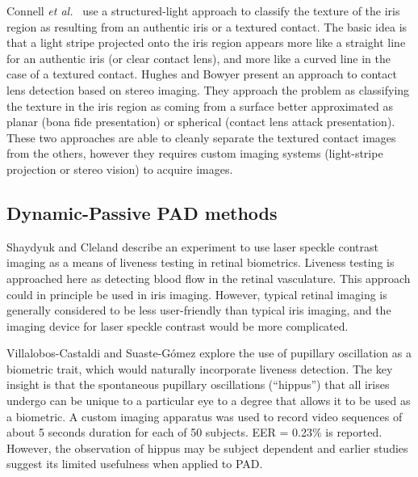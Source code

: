 \documentclass[format=acmsmall, review=false, timestamp=false]{acmart}
\newcommand{\etal}{{\it et al.}~}
\begin{document}
Connell \etal \cite{Connell_ASSP_2013} use a structured-light approach to classify the texture of the iris region as resulting from a{n authentic} iris or a textured contact. The basic idea is that a light stripe projected onto the iris region appears more like a straight {line} for a{n authentic} iris (or clear contact lens), and more like a curved line in the case of a textured contact. Hughes and Bowyer \cite{Hughes_HICSS_2013} present an approach to contact lens detection based on stereo imaging. They approach the problem as classifying the texture in the iris region as coming from a surface better approximated as planar (bona fide {presentation}) or spherical (contact lens attack {presentation}). These two approaches are able to cleanly separate the textured contact images from the others, however they requires custom imaging systems (light-stripe projection or stereo vision) to acquire images. 




\subsection{Dynamic-Passive PAD methods}
\label{sec:PADmethods_DynamicPassive}

Shaydyuk and Cleland \cite{Shaydyuk_ICCST_2016} describe an experiment to use laser speckle contrast imaging as a means of liveness testing in retinal biometrics. Liveness testing is approached here as detecting blood flow in the retinal vasculature. This approach could in principle be used in iris imaging. However, typical retinal imaging is generally considered to be less user-friendly than typical iris imag{ing}, and the imaging device for laser speckle contrast would be more complicated.

Villalobos-Castaldi and {Suaste-G\'{o}mez} \cite{Villalbos-Castaldi_BF_2014} explore the use of pupillary oscillation as a biometric trait, which would naturally incorporate liveness detection. The key insight is that the spontaneous pupillary oscillations (``hippus'') that all irises undergo can be unique to a particular eye to a degree that allows it to be used as a biometric. A custom imaging apparatus was used to record video sequences of about 5 seconds duration for each of 50 subjects. {EER = 0.23\%} is reported. However, the observation of hippus may be subject dependent and earlier studies \cite{Pacut_ICCST_2006} suggest its limited usefulness when applied to PAD.
\end{document}
